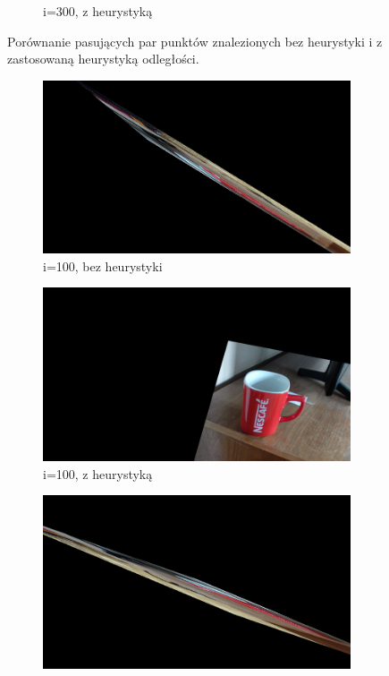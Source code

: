 \documentclass{article}
\begin{document}
\begin{figure}[H]
\begin{subfigure}[b]{0.35\linewidth}
			\caption{i=300, z heurystyką}
		\end{subfigure}
		\caption{Porównanie pasujących par punktów znalezionych bez heurystyki i z zastosowaną heurystyką odległości.}
			\label{fig:h2}
	\end{figure}
	\begin{figure}[H]
		\centering
		\begin{subfigure}[b]{0.35\linewidth}
			\includegraphics[width=\linewidth]{100t1.png}
			\caption{i=100, bez heurystyki}
		\end{subfigure}
		\begin{subfigure}[b]{0.35\linewidth}
			\includegraphics[width=\linewidth]{100t2.png}
			\caption{i=100, z heurystyką}
		\end{subfigure}
		\begin{subfigure}[b]{0.35\linewidth}
			\includegraphics[width=\linewidth]{200t1.png}

\end{subfigure}
\end{figure}
\end{document}
